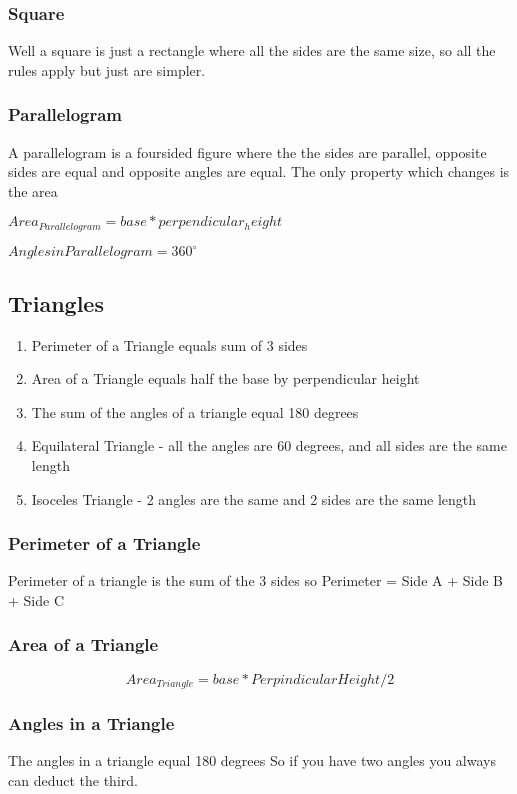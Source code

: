 \documentclass{article}
\begin{document}
\subsubsection{Square}
Well a square is just a rectangle where all the sides are the same size, so all the rules apply but just are simpler.

\subsubsection{Parallelogram}
A parallelogram is a foursided figure where the the sides are parallel, opposite sides are equal and opposite angles are equal.
The only property which changes is the area

$Area_{Parallelogram} = base * perpendicular_height$

$Angles in Parallelogram  = 360^{\circ}$


\newpage
\subsection{Triangles}
\begin{enumerate}
\item Perimeter of a Triangle equals sum of 3 sides
\item Area of a Triangle equals half the base by perpendicular height
\item The sum of the angles of a triangle equal 180 degrees
\item Equilateral Triangle - all the angles are 60 degrees, and all sides are the same length
\item Isoceles Triangle - 2 angles are the same and 2 sides are the same length
\end{enumerate}
\subsubsection{Perimeter of a Triangle}
Perimeter of a triangle is the sum of the 3 sides so
Perimeter = Side A + Side B + Side C
\subsubsection{Area of a Triangle}
\begin{equation}
Area_{Triangle} = base * Perpindicular Height / 2
\end{equation}
\subsubsection{Angles in a Triangle}
The angles in a triangle equal 180 degrees
So if you have two angles you always can deduct the third.
\newpage
\end{document}
